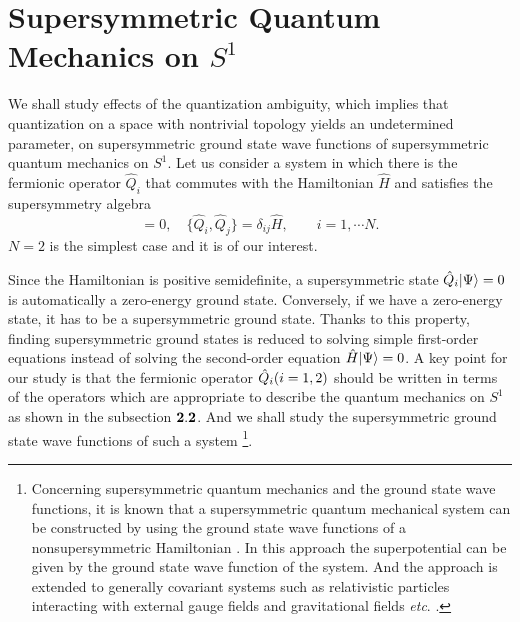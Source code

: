 \documentclass[a4paper,12pt]{article}
\begin{document}
\section{Supersymmetric Quantum Mechanics on $S^1$}
We shall study effects of the quantization ambiguity, which implies 
that quantization on a space with nontrivial topology yields an 
undetermined parameter, on supersymmetric ground state wave functions of 
supersymmetric quantum mechanics on $S^1$. 
Let us consider a system in which there is the fermionic operator 
${\hat Q}_i$ that commutes with the Hamiltonian $\hat H$ and 
satisfies the supersymmetry algebra
\begin{equation}
[{\hat Q}_i, {\hat H} ]=0,\quad 
\{{\hat Q}_i, {\hat Q}_j\}=\delta_{ij} \hat H,
\qquad i=1,\cdots N.
\label{susy}
\end{equation} 
$N=2$ is the simplest case and it is of our interest. 
\par
Since the Hamiltonian is positive semidefinite, a supersymmetric 
state $\hat Q_i |{\Psi}\rangle=0$ is automatically a zero-energy ground state.
Conversely, if we have a zero-energy state, it has to be a supersymmetric 
ground state. Thanks to this property, finding supersymmetric ground states
is reduced to solving simple first-order equations
instead of solving the second-order equation ${\hat H}|{\Psi}\rangle=0$.
A key point for our study is that the fermionic 
operator $\hat Q_i (i=1, 2)$ should be written in terms of the operators 
which are appropriate
to describe the quantum mechanics on $S^1$ as shown in the 
subsection ${\bf 2.2}$. 
And we shall study the supersymmetric ground state wave functions 
of such a system \footnote{Concerning supersymmetric 
quantum mechanics and the ground state wave functions, it is known 
that a supersymmetric quantum mechanical system can be constructed by 
using the ground state 
wave functions of a nonsupersymmetric Hamiltonian \cite{gozzi}. 
In this approach the superpotential can be given by
the ground state 
wave function of the system. And the approach is extended to 
generally covariant systems such as relativistic particles interacting with 
external gauge fields and gravitational fields {\it etc}. \cite{gamboa}.}.
\par
\end{document}

